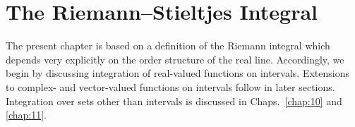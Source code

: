 \chapter{The Riemann--Stieltjes Integral}

The present chapter is based on a definition of the Riemann integral which depends very explicitly on the order structure of the real line. Accordingly, we begin by discussing integration of real-valued functions on intervals. Extensions to complex- and vector-valued functions on intervals follow in later sections. Integration over sets other than intervals is discussed in Chaps.~\ref{chap:10} and \ref{chap:11}.



